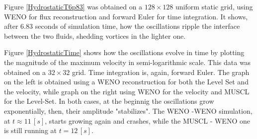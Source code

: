 \documentclass[11pt, a4paper, oneside, openany]{book}
\begin{document}
Figure \ref{HydrostaticT6p83} was obtained on a $128\times128$ uniform static grid, using WENO for flux reconstruction and forward Euler for time integration. It shows, after $6.83$ seconds of simulation time, how the oscillations ripple the interface between the two fluids, shedding vortices in the lighter one.\par
Figure \ref{HydrostaticTime} shows how the oscillations evolve in time by plotting the magnitude of the maximum velocity in semi-logarithmic scale. This data was obtained on a $32\times32$ grid. Time integration is, again, forward Euler. The graph on the left is obtained using a WENO reconstruction for both the Level Set and the velocity, while graph on the right using WENO for the velocity and MUSCL for the Level-Set. In both cases, at the beginnig the oscillations grow exponentially, then, their amplitude "stabilizes". The WENO -WENO simulation, at $t\approx 11\,[s]$, starts growing again and crashes, while the MUSCL - WENO one is still running at $t=12\,[s]$.\par
\end{document}
